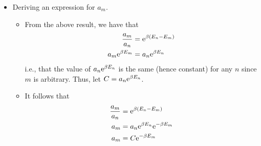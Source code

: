 \documentclass[../notes.tex]{subfiles}
\begin{document}
\begin{itemize}
\begin{itemize}
        \begin{equation*}
            \frac{a_m}{a_n} = f(E_n-E_m)
        \end{equation*}
        \item The above equation must hold for any two energy states, so we can also write $a_l/a_m=f(E_m-E_l)$ and $a_l/a_n=f(E_n-E_l)$ for instance. But this implies that
        \begin{align*}
            \frac{a_l}{a_n} &= \frac{a_m}{a_n}\cdot\frac{a_l}{a_m}\\
            f(E_n-E_l) &= f(E_n-E_m)f(E_m-E_l)
        \end{align*}
        \item The above equation uniquely describes an exponential function, so we take $f(E)=\e[\beta E]$\footnote{Note that the base need not be $\e$, but we can take it to be $\e$ WLOG since $\e[\beta E]=(\e[\beta])^E$ and we may take $\beta$ such that $\e[\beta]$ equals any positive real number.}.
        \begin{itemize}
            \item To check that our definition of $f$ satisfies the above equation, note that
            \begin{equation*}
                \e[\beta(E_n-E_l)] = \e[\beta(E_n-E_m)]\e[\beta(E_m-E_l)]
            \end{equation*}
        \end{itemize}
    \end{itemize}
    \item Deriving an expression for $a_m$.
    \begin{itemize}
        \item From the above result, we have that
        \begin{align*}
            \frac{a_m}{a_n} &= \e[\beta(E_n-E_m)]\\
            a_m\e[\beta E_m] &= a_n\e[\beta E_n]
        \end{align*}
        i.e., that the value of $a_n\e[\beta E_n]$ is the same (hence constant) for any $n$ since $m$ is arbitrary. Thus, let $C=a_n\e[\beta E_n]$.
        \item It follows that
        \begin{align*}
            \frac{a_m}{a_n} &= \e[\beta(E_n-E_m)]\\
            a_m &= a_n\e[\beta E_n]\e[-\beta E_m]\\
            a_m &= C\e[-\beta E_m]
        \end{align*}
    \end{itemize}

\end{itemize}
\end{document}
